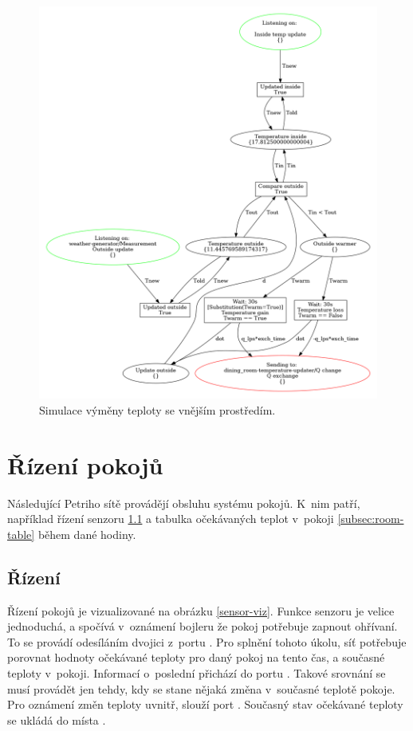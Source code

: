 \begin{figure}[htb]
 \centering
 \includegraphics[width=\textwidth]{obrazky-figures/room-exchange.png}
 \caption{Simulace výměny teploty se vnějším prostředím.}
 \label{exchange-viz}
\end{figure}


\section{Řízení pokojů}
\label{sec:server-details}

Následující Petriho sítě provádějí obsluhu systému pokojů. K~nim patří, například řízení senzoru \ref{subsec:room-control} a tabulka očekávaných teplot v~pokoji \ref{subsec:room-table} během dané hodiny.

\subsection{Řízení}
\label{subsec:room-control}

Řízení pokojů je vizualizované na obrázku \ref{sensor-viz}. Funkce senzoru je velice jednoduchá, a spočívá v~oznámení bojleru že pokoj potřebuje zapnout ohřívaní. To se provádí odesíláním dvojici  z~portu . Pro splnění tohoto úkolu, síť potřebuje porovnat hodnoty očekávané teploty pro daný pokoj na tento čas, a současné teploty v~pokoji. Informací o~poslední přichází do portu . Takové srovnání se musí provádět jen tehdy, kdy se stane nějaká změna v~současné teplotě pokoje.  Pro oznámení změn teploty uvnitř, slouží port . Současný stav očekávané teploty se ukládá do místa .

